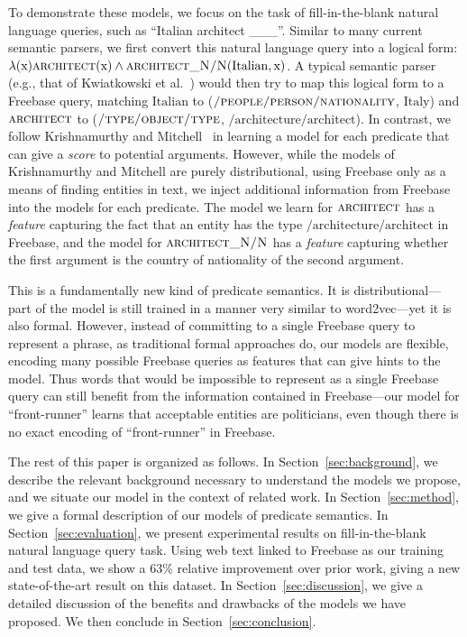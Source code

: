 \documentclass[11pt]{article}
\newcommand{\secref}[1]{Section~\ref{sec:#1}}
\newcommand{\blank}{\_\_\_}
\newcommand{\predicate}[1]{\ensuremath{\textsc{#1}}}
\newcommand{\entity}[1]{\ensuremath{\mathrm{#1}}}
\begin{document}
To demonstrate these models, we focus on the task of fill-in-the-blank natural
language queries, such as ``Italian architect \blank{}''.  Similar to many
current semantic parsers, we first convert this natural language query into a
logical form: $\lambda(\entity{x}) \predicate{architect}(\entity{x}) \land
\predicate{architect\_N/N}(\entity{Italian}, \entity{x})$.  A typical semantic
parser (e.g., that of Kwiatkowski et
al.~) would then try to map this
logical form to a Freebase query, matching \entity{Italian} to
(\predicate{/people/person/nationality}, \entity{Italy}) and
\predicate{architect} to (\predicate{/type/object/type},
\entity{/architecture/architect}).  In contrast, we follow Krishnamurthy and
Mitchell~ in learning a
model for each predicate that can give a \emph{score} to potential arguments.
However, while the models of Krishnamurthy and Mitchell are purely
distributional, using Freebase only as a means of finding entities in text, we
inject additional information from Freebase into the models for each predicate.
The model we learn for \predicate{architect} has a \emph{feature} capturing the
fact that an entity has the type \entity{/architecture/architect} in Freebase,
and the model for \predicate{architect\_N/N} has a \emph{feature} capturing
whether the first argument is the country of nationality of the second
argument.

This is a fundamentally new kind of predicate semantics.  It is
distributional---part of the model is still trained in a manner very similar to
word2vec---yet it is also formal.  However, instead of committing to a single
Freebase query to represent a phrase, as traditional formal approaches do, our
models are flexible, encoding many possible Freebase queries as features that
can give hints to the model.  Thus words that would be impossible to represent
as a single Freebase query can still benefit from the information contained in
Freebase---our model for ``front-runner'' learns that acceptable entities are
politicians, even though there is no exact encoding of ``front-runner'' in
Freebase.

The rest of this paper is organized as follows.  In \secref{background}, we
describe the relevant background necessary to understand the models we propose,
and we situate our model in the context of related work.  In \secref{method},
we give a formal description of our models of predicate semantics.  In
\secref{evaluation}, we present experimental results on fill-in-the-blank
natural language query task.  Using web text linked to Freebase as our training
and test data, we show a 63\% relative improvement over prior work, giving a
new state-of-the-art result on this dataset.  In \secref{discussion}, we give a
detailed discussion of the benefits and drawbacks of the models we have
proposed.  We then conclude in \secref{conclusion}.
\end{document}

